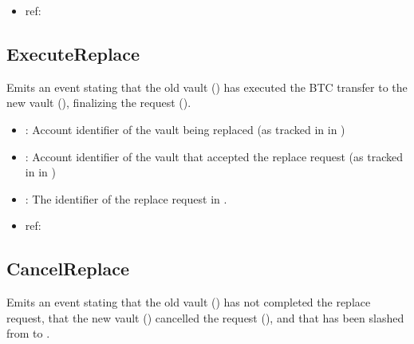 \documentclass[a4paper,10pt,english]{sphinxmanual}
\begin{document}
\begin{itemize}
\item {} 
ref:

\end{itemize}


\subsection{ExecuteReplace}
\label{\detokenize{spec/replace:id16}}
Emits an event stating that the old vault () has executed the BTC transfer to the new vault (), finalizing the  request ().



\begin{itemize}
\item {} 
: Account identifier of the vault being replaced (as tracked in  in {\hyperref[\detokenize{spec/vault-registry:vault-registry}]{}})

\item {} 
: Account identifier of the vault that accepted the replace request (as tracked in  in {\hyperref[\detokenize{spec/vault-registry:vault-registry}]{}})

\item {} 
: The identifier of the replace request in .

\end{itemize}

\begin{itemize}
\item {} 
ref:

\end{itemize}


\subsection{CancelReplace}
\label{\detokenize{spec/replace:id17}}
Emits an event stating that the old vault () has not completed the replace request, that the new vault () cancelled the  request (), and that  has been slashed from  to .
\end{document}
